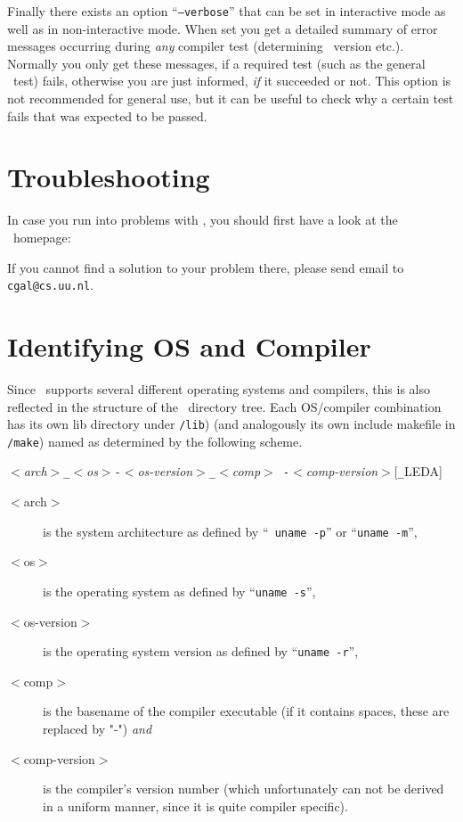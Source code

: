 Finally there exists an option ``\texttt{--verbose}'' that can be set
in interactive mode as well as in non-interactive mode. When set you
get a detailed summary of error messages occurring during \textit{any}
compiler test (determining \stl\ version etc.). Normally you only get
these messages, if a required test (such as the general \stl\ test)
fails, otherwise you are just informed, \textit{if} it succeeded or
not.  This option is not recommended for general use, but it can be
useful to check why a certain test fails that was expected to be
passed.

\section{Troubleshooting\label{sec:troubleshooting}}

In case you run into problems with \cgal, you should first have a look
at the \cgal\ homepage:
\begin{alltt}
\cgalhomepage
\end{alltt}
If you cannot find a solution to your problem there, please send email
to \texttt{cgal@cs.uu.nl}.

\section{Identifying OS and Compiler}\label{sec:os-compiler-id}

Since \cgal\ supports several different operating systems and
compilers, this is also reflected in the structure of the \cgal\ 
directory tree. Each OS/compiler combination has its own lib directory
under \texttt{\cgaldir/lib}) (and analogously its own include makefile
in \texttt{\cgaldir/make}) named as determined by the following
scheme.
\begin{center}
  \textit{$<$arch$>$\texttt{\_}$<$os$>$\texttt{-}$<$os-version$>$\texttt{\_}$<$comp$>${\tt
    -}$<$comp-version$>$}[\texttt{\_}LEDA]
\end{center}

\begin{description}
\item[$<$arch$>$] is the system architecture as defined by ``{\tt
    uname -p}'' or ``\texttt{uname -m}'',
\item[$<$os$>$] is the operating system as defined by ``\texttt{uname
    -s}'',
\item[$<$os-version$>$] is the operating system version as defined by
  ``\texttt{uname -r}'',
\item[$<$comp$>$] is the basename of the compiler executable (if it
  contains spaces, these are replaced by "-") \textit{and}
\item[$<$comp-version$>$] is the compiler's version number (which
  unfortunately can not be derived in a uniform manner, since it is
  quite compiler specific).
\end{description}

